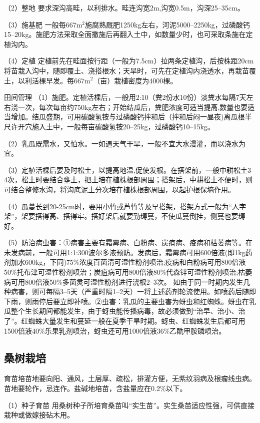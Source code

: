 \documentclass{ctexbook}
\begin{document}
（2）整地 要求深沟高畦，以利排水。畦连沟宽2m,沟宽0.5m，沟深25--35cm。

（3）施基肥 一般每667m$^2$施腐熟厩肥1250kg左右，河泥5000--2250kg，过磷酸钙15--20kg。施肥方法采取全面撒施后再翻入土中，如数量少时，也可采取条施在定植沟内。

（4）定植 定植前先在畦面按行距（一般为7.5cm）拉两条定植沟，后按株距20cm将苗栽入沟中，随即覆土、浇搭根水；天旱时，可先在定植沟内浇透水，再栽苗覆土，以利活棵早发。每667m$^2$（亩）栽植密度为4000棵。

田间管理
（1）施肥。定植活棵后，一般用2:10（粪2份水10份）淡粪水每隔7天左右浇一次，每次每亩约750kg左右；开始结瓜后，粪肥浓度可适当提高,数量也要适当增加。结瓜盛期，可用碳酸氢铵与过磷酸钙拌和后（拌和后闷一昼夜)离瓜根半尺许开穴施入土中，一般每亩碳酸氢铵20--25kg，过磷酸钙10--15kg。

（2）乳瓜既需水，又怕水。一如遇天气干旱，一般不宜大水漫灌，而以浇水为宜。

（3）定植活棵后要及时松土，以提高地温,促使发根。在搭架前，一般中耕松土3--4次，松土时要结合壅土，把土培在植株根部周围；搭架后，中耕松土不便时，则可结合整修水沟，将沟底泥土分次培在植株根部周围，以起护根保墒作用。

（4）瓜蔓长到20-25cm时，要用小竹或芦竹等及早搭架，搭架方式一般为“人字架”，架要搭得高、搭得牢。搭好架后就要勤缚蔓，不使瓜蔓倒挂，侧蔓也要缚好。

（5）防治病虫害：①病害主要有霜霉病、白粉病、炭疽病、疫病和枯萎病等。在未发病前，一般可用1:1:300波尔多液预防。发病后，霜霉病可用600倍液(即1kg药剂加水600kg，下同)75\%浓度百菌清可湿性粉剂喷治;疫病和白粉病可用800倍液50\%托布津可湿性粉剂喷治；炭疽病可用800倍液80\%代森锌可湿性粉剂喷治;枯萎病可用800倍液50\%多菌灵可湿性粉剂进行浇根2--3次。
如由于同一时期内发生几种病害，则可每隔3--5天（严重时隔1--2天）一将上述药剂轮流使用。如喷药后随即下雨，则雨停后要立即补喷。②虫害：乳瓜的主要虫害为蚜虫和红蜘蛛。蚜虫在乳瓜整个生长期间都能发生，由于蚜虫能传播病毒，故必须做到“治早、治小、治了”。红蜘蛛大量发生和蔓延一般在夏季干旱时期。蚜虫、红蜘蛛发生后都可用1500倍液40\%乐果乳剂喷治，蚜虫还可用1000倍液36\%乙酰甲胺磷喷治。
\subsection{桑树栽培}
育苗培苗地要向阳、通风，土层厚、疏松，排灌方便，无紫纹羽病及根瘤线虫病。苗地要轮作，忌连作。盐碱地培苗，含盐量应在0.2\%以下。

（1）种子育苗 用桑树种子所培育桑苗叫“实生苗”。实生桑苗适应性强，可供直接栽种或做嫁接砧木用。
\end{document}
